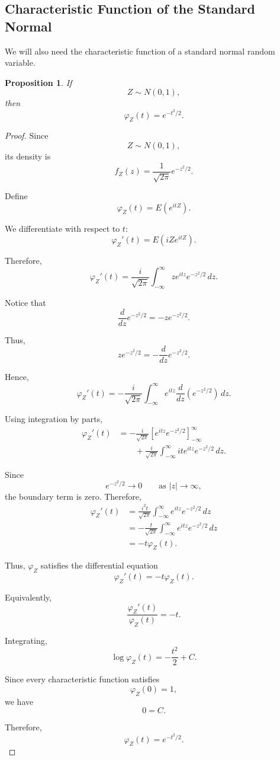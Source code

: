 \documentclass[11pt]{article}
\theoremstyle{definition}
\theoremstyle{plain}
\newtheorem{proposition}{Proposition}
\theoremstyle{remark}
\begin{document}
\subsection*{Characteristic Function of the Standard Normal}

We will also need the characteristic function of a standard normal
random variable.

\begin{proposition}
If
\[
Z\sim N(0,1),
\]
then
\[
\varphi_Z(t)
=
e^{-t^2/2}.
\]
\end{proposition}

\begin{proof}
Since
\[
Z\sim N(0,1),
\]
its density is
\[
f_Z(z)
=
\frac{1}{\sqrt{2\pi}}e^{-z^2/2}.
\]

Define
\[
\varphi_Z(t)
=
E(e^{itZ}).
\]

We differentiate with respect to $t$:
\[
\varphi_Z'(t)
=
E\left(iZe^{itZ}\right).
\]

Therefore,
\[
\varphi_Z'(t)
=
\frac{i}{\sqrt{2\pi}}
\int_{-\infty}^{\infty}
z e^{itz}e^{-z^2/2}\,dz.
\]

Notice that
\[
\frac{d}{dz}e^{-z^2/2}
=
-ze^{-z^2/2}.
\]

Thus,
\[
ze^{-z^2/2}
=
-\frac{d}{dz}e^{-z^2/2}.
\]

Hence,
\[
\varphi_Z'(t)
=
-\frac{i}{\sqrt{2\pi}}
\int_{-\infty}^{\infty}
e^{itz}
\frac{d}{dz}
\left(e^{-z^2/2}\right)
\,dz.
\]

Using integration by parts,
\begin{align*}
\varphi_Z'(t)
&=
-\frac{i}{\sqrt{2\pi}}
\left[
e^{itz}e^{-z^2/2}
\right]_{-\infty}^{\infty}
\\
&\qquad
+
\frac{i}{\sqrt{2\pi}}
\int_{-\infty}^{\infty}
it e^{itz}e^{-z^2/2}\,dz.
\end{align*}

Since
\[
e^{-z^2/2}\to0
\qquad
\text{as }|z|\to\infty,
\]
the boundary term is zero. Therefore,
\begin{align*}
\varphi_Z'(t)
&=
\frac{i^2t}{\sqrt{2\pi}}
\int_{-\infty}^{\infty}
e^{itz}e^{-z^2/2}\,dz
\\
&=
-\frac{t}{\sqrt{2\pi}}
\int_{-\infty}^{\infty}
e^{itz}e^{-z^2/2}\,dz
\\
&=
-t\varphi_Z(t).
\end{align*}

Thus, $\varphi_Z$ satisfies the differential equation
\[
\varphi_Z'(t)
=
-t\varphi_Z(t).
\]

Equivalently,
\[
\frac{\varphi_Z'(t)}{\varphi_Z(t)}
=
-t.
\]

Integrating,
\[
\log\varphi_Z(t)
=
-\frac{t^2}{2}+C.
\]

Since every characteristic function satisfies
\[
\varphi_Z(0)=1,
\]
we have
\[
0=C.
\]

Therefore,
\[
\varphi_Z(t)
=
e^{-t^2/2}.
\]
\end{proof}
\end{document}
